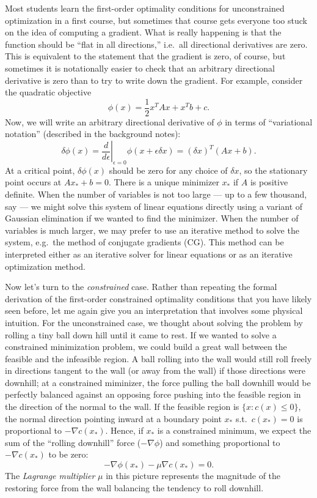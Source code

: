 \documentclass[12pt, leqno]{article} %
\begin{document}
Most students learn the first-order optimality conditions for unconstrained
optimization in a first course, but sometimes that course gets
everyone too stuck on the idea of computing a gradient.  What is
really happening is that the function should be ``flat in all directions,''
i.e.~all directional derivatives are zero.  This is equivalent to the
statement that the gradient is zero, of course, but sometimes it is
notationally easier to check that an arbitrary directional derivative
is zero than to try to write down the gradient.  For example, consider
the quadratic objective
\[
  \phi(x) = \frac{1}{2} x^T A x + x^T b + c.
\]
Now, we will write an arbitrary directional derivative of $\phi$ in
terms of ``variational notation'' (described in the background notes):
\[
\delta \phi(x) =
\left. \frac{d}{d\epsilon} \right|_{\epsilon = 0} \phi(x+ \epsilon \delta x)
= (\delta x)^T (Ax + b).
\]
At a critical point, $\delta \phi(x)$ should be zero for any
choice of $\delta x$, so the stationary point occurs at $Ax_* + b = 0$.
There is a unique minimizer $x_*$ if $A$ is positive definite.
When the number of variables is not too large --- up to a few
thousand, say --- we might solve this system of linear equations
directly using a variant of Gaussian elimination
if we wanted to find the minimizer.  When the number of variables
is much larger, we may prefer to use an iterative method 
to solve the system, e.g.~the method of conjugate gradients (CG).
This method can be interpreted either as an iterative solver for
linear equations or as an iterative optimization method.

Now let's turn to the {\em constrained} case.  Rather than repeating
the formal derivation of the first-order constrained optimality
conditions that you have likely seen before, let me again give you an
interpretation that involves some physical intuition.  For the
unconstrained case, we thought about solving the problem by rolling
a tiny ball down hill until it came to rest.  If we wanted to solve a
constrained minimization problem, we could build a great wall between
the feasible and the infeasible region.  A ball rolling into the wall
would still roll freely in directions tangent to the wall (or away
from the wall) if those directions were downhill; at a constrained
miminizer, the force pulling the ball downhill would be perfectly
balanced against an opposing force pushing into the feasible region
in the direction of the normal to the wall.  If the feasible region
is $\{x : c(x) \leq 0\}$, the normal direction pointing inward at a
boundary point $x_*$ s.t.~$c(x_*) = 0$ is proportional to
$-\nabla c(x_*)$.  Hence, if $x_*$ is a constrained minimum,
we expect the sum of the ``rolling downhill'' force ($-\nabla \phi$)
and something proportional to $-\nabla c(x_*)$ to be zero:
\[
  -\nabla \phi(x_*) - \mu \nabla c(x_*) = 0.
\]
The {\em Lagrange multiplier} $\mu$ in this picture represents the
magnitude of the restoring force from the wall balancing the tendency
to roll downhill.
\end{document}
